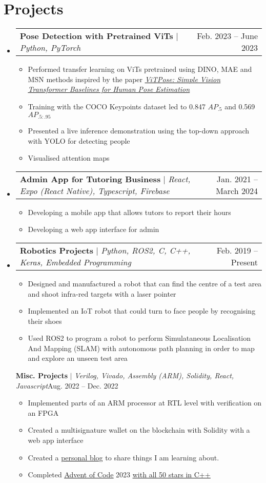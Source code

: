 \documentclass[letterpaper,11pt]{article}
\makeatletter
\newcommand{\resumeItem}[1]{
  \item\small{
    {#1 \vspace{-2pt}}
  }
}
\newcommand{\resumeProjectHeading}[2]{
  \item
  \begin{tabular*}{0.97\textwidth}{l@{\extracolsep{\fill}}r}
    \small#1 & #2 \\
  \end{tabular*}\vspace{-7pt}
}
\newcommand{\resumeSubHeadingListStart}{\begin{itemize}[leftmargin=0.15in, label={}]}
\newcommand{\resumeSubHeadingListEnd}{\end{itemize}}
\newcommand{\resumeItemListStart}{\begin{itemize}}
\newcommand{\resumeItemListEnd}{\end{itemize}\vspace{-5pt}}
\makeatother
\begin{document}
\newpage
\section{Projects}
\resumeSubHeadingListStart
\resumeProjectHeading
{\textbf{Pose Detection with Pretrained ViTs} $|$ \emph{Python, PyTorch}}{Feb. 2023 -- June 2023}
\resumeItemListStart
\resumeItem{Performed transfer learning on ViTs pretrained using DINO, MAE and MSN methods inspired by the paper \href{https://doi.org/10.48550/arXiv.2204.12484}{\underline{\textit{ViTPose: Simple Vision Transformer Baselines for Human Pose Estimation}}}}
\resumeItem{Training with the COCO Keypoints dataset led to 0.847 $AP_{.5}$ and
  0.569 $AP_{.5:.95}$}
\resumeItem{Presented a live inference demonstration using the top-down approach with YOLO
  for detecting people}
\resumeItem{Visualised attention maps}
\resumeItemListEnd
\resumeProjectHeading
{\textbf{Admin App for Tutoring Business} $|$ \emph{React, Expo (React Native), Typescript, Firebase}}{Jan. 2021 -- March 2024}
\resumeItemListStart
\resumeItem{Developing a mobile app that allows tutors to report their hours}
\resumeItem{Developing a web app interface for admin}
\resumeItemListEnd
\resumeProjectHeading
{\textbf{Robotics Projects} $|$ \emph{Python, ROS2, C, C++, Keras, Embedded Programming}}{Feb. 2019 -- Present}
\resumeItemListStart
\resumeItem{Designed and manufactured a robot that can find the centre of a test area and
  shoot infra-red targets with a laser pointer}
\resumeItem{Implemented an IoT robot that could turn to face people by recognising their
  shoes}
\resumeItem{Used ROS2 to program a robot to perform Simulataneous Localisation And Mapping
  (SLAM) with autonomous path planning in order to map and explore an unseen test
  area}
\resumeItemListEnd
{\textbf{Misc. Projects} $|$ \emph{Verilog, Vivado, Assembly (ARM), Solidity, React, Javascript}}{Aug. 2022 -- Dec. 2022}
\resumeItemListStart
\resumeItem{Implemented parts of an ARM processor at RTL level with verification on an FPGA}
\resumeItem{Created a multisignature wallet on the blockchain with Solidity with a web app
  interface}
\resumeItem{Created a \href{https://tariqs.com.au/}{\underline{personal blog}} to share things I am learning about.}
\resumeItem{Completed \href{https://adventofcode.com/}{\underline{Advent of Code}} 2023 \href{https://github.com/TSoli/advent-of-code}{\underline{with all 50 stars in C++}}}
\resumeItemListEnd
\resumeSubHeadingListEnd

%
\end{document}
